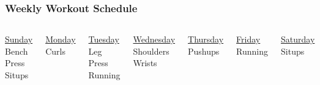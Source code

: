  
\begin{frame}
\frametitle{Weekly Workout Schedule}
\begin{columns}
\centering \underline{Sunday} \\
Bench Press
Situps

\centering \underline{Monday} \\
Curls


\centering \underline{Tuesday} \\
Leg Press \\
Running


\centering \underline{Wednesday} \\
Shoulders \\
Wrists

\centering \underline{Thursday} \\
Pushups

\centering \underline{Friday} \\ 
Running

\centering \underline{Saturday} \\
Situps

\end{columns}
\end{frame}  
